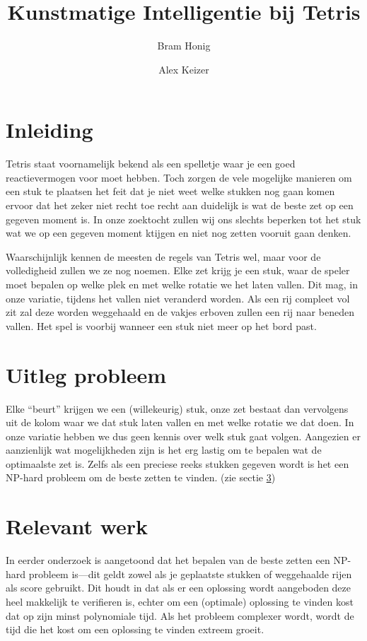 \documentclass[10pt]{article}
\author{Bram Honig \and Alex Keizer}
\title{Kunstmatige Intelligentie bij Tetris}
\begin{document}

\maketitle

\section{Inleiding} 
Tetris staat voornamelijk bekend als een spelletje waar je een goed reactievermogen voor moet hebben. Toch zorgen de vele mogelijke manieren om een stuk te plaatsen het feit dat je niet weet welke stukken nog gaan komen ervoor dat het zeker niet recht toe recht aan duidelijk is wat de beste zet op een gegeven moment is. In onze zoektocht zullen wij ons slechts beperken tot het stuk wat we op een gegeven moment ktijgen en niet nog zetten vooruit gaan denken.

Waarschijnlijk kennen de meesten de regels van Tetris wel, maar voor de volledigheid zullen we ze nog noemen. Elke zet krijg je een stuk, waar de speler moet bepalen op welke plek en met welke rotatie we het laten vallen. Dit mag, in onze variatie, tijdens het vallen niet veranderd worden. Als een rij compleet vol zit zal deze worden weggehaald en de vakjes erboven zullen een rij naar beneden vallen. Het spel is voorbij wanneer een stuk niet meer op het bord past.

\section{Uitleg probleem}\label{probleem}

Elke ``beurt'' krijgen we een (willekeurig) stuk, onze zet bestaat dan vervolgens uit de kolom waar we dat stuk laten vallen en met welke rotatie we dat doen. In onze variatie hebben we dus geen kennis over welk stuk gaat volgen. Aangezien er aanzienlijk wat mogelijkheden zijn is het erg lastig om te bepalen wat de optimaalste zet is. Zelfs als een preciese reeks stukken gegeven wordt is het een NP-hard probleem om de beste zetten te vinden. \cite{nphard} (zie sectie \ref{relevant})

\section{Relevant werk}\label{relevant}

In eerder onderzoek is aangetoond dat het bepalen van de beste zetten een NP-hard probleem\cite{nphard} is---dit geldt zowel als je geplaatste stukken of weggehaalde rijen als score gebruikt. Dit houdt in dat als er een oplossing wordt aangeboden deze heel makkelijk te verifieren is, echter om een (optimale) oplossing te vinden kost dat op zijn minst polynomiale tijd. Als het probleem complexer wordt, wordt de tijd die het kost om een oplossing te vinden extreem groeit.
\end{document}
